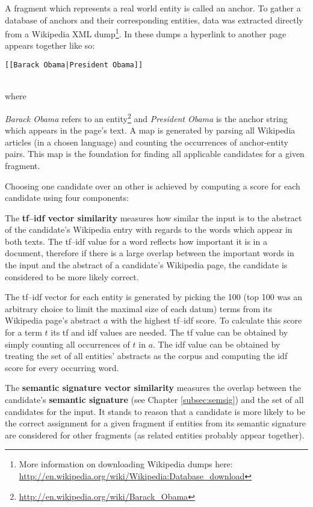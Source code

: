 \documentclass[runningheads,a4paper]{llncs}
\begin{document}
A fragment which represents a real world entity is called an anchor. To gather a database of anchors and their corresponding entities, data was extracted directly from a Wikipedia XML dump\footnote{More information on downloading Wikipedia dumps here: \url{http://en.wikipedia.org/wiki/Wikipedia:Database_download}}. In these dumps a hyperlink to another page appears together like so:\\
\centerline{\tt{[[Barack Obama|President Obama]]}}\\
where {\textit{Barack Obama} refers to an entity\footnote{\url{http://en.wikipedia.org/wiki/Barack_Obama}} and \textit{President Obama} is the anchor string which appears in the page's text. A map is generated by parsing all Wikipedia articles (in a chosen language) and counting the occurrences of anchor-entity pairs. This map is the foundation for finding all applicable candidates for a given fragment.

Choosing one candidate over an other is achieved by computing a score for each candidate using four components:

The \textbf{tf--idf vector similarity} measures how similar the input is to the abstract of the candidate's Wikipedia entry with regards to the words which appear in both texts. The tf--idf value for a word reflects how important it is in a document, therefore if there is a large overlap between the important words in the input and the abstract of a candidate's Wikipedia page, the candidate is considered to be more likely correct.

The tf--idf vector for each entity is generated by picking the 100 (top 100 was an arbitrary choice to limit the maximal size of each datum) terms from its Wikipedia page's abstract $a$ with the highest tf--idf score. To calculate this score for a term $t$ its tf and idf values are needed. The tf value can be obtained by simply counting all occurrences of $t$ in $a$. The idf value can be obtained by treating the set of all entities' abstracts as the corpus and computing the idf score for every occurring word.


The \textbf{semantic signature vector similarity} measures the overlap between the candidate's \textbf{semantic signature} (see Chapter \ref{subsec:semsig}) and the set of all candidates for the input. It stands to reason that a candidate is more likely to be the correct assignment for a given fragment if entities from its semantic signature are considered for other fragments (as related entities probably appear together).

}
\end{document}

